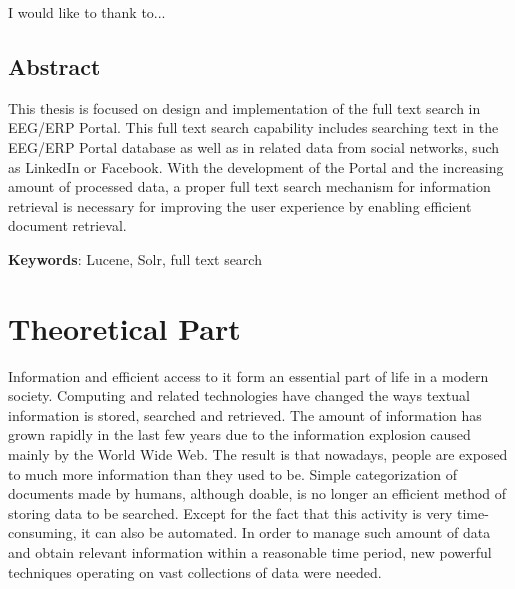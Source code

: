 \documentclass[12pt, oneside, a4paper]{book}
\begin{document}
I would like to thank to...

\pagebreak{}


\thispagestyle{empty}


\chapter*{Abstract}


This thesis is focused on design and implementation of the full text
search in EEG/ERP Portal. This full text search capability includes
searching text in the EEG/ERP Portal database as well as in related
data from social networks, such as LinkedIn or Facebook. With the
development of the Portal and the increasing amount of processed data,
a proper full text search mechanism for information retrieval is necessary
for improving the user experience by enabling efficient do\-cu\-ment retrieval. 

\pagebreak{}

{\bf Keywords}:
Lucene, Solr, full text search

\thispagestyle{empty}

\vfill\eject

\tableofcontents

\mainmatter

\pagestyle{plain}





\part{Theoretical Part}

Information and efficient access to it form an essential part of life in a modern society. 
Computing and related technologies have changed the ways textual information is stored, searched and retrieved. 
The amount of information has grown rapidly in the last few years due to the information explosion caused mainly by the World Wide Web. 
The result is that nowadays, people are exposed to much more information than they used to be. 
Simple categorization of documents made by humans, although doable, is no longer an efficient method of storing data to be searched. 
Except for the fact that this activity is very time-consuming, it can also be automated. 
In order to manage such amount of data and obtain relevant information within a reasonable time period, new powerful techniques operating on vast collections of data were needed.
\end{document}
